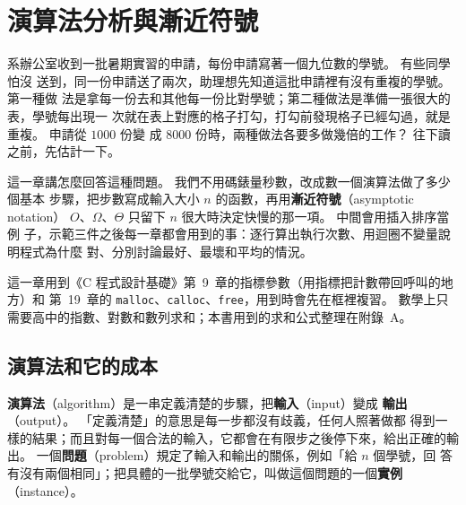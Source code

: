 \chapter{演算法分析與漸近符號}
\label{ch:analysis}

\newcommand{\insrow}[5]{%
    \node[anchor=east, font=\small] at (0.3, #1) {#2};
    \foreach \v [count=\k] in {#3} {
        \ifnum\k=#5\relax
            \node[hlcell] at (\k*0.9, #1) {\v};
        \else\ifnum\k>#4\relax
            \node[cell] at (\k*0.9, #1) {\v};
        \else
            \node[sortedcell] at (\k*0.9, #1) {\v};
        \fi\fi
    }
}

系辦公室收到一批暑期實習的申請，每份申請寫著一個九位數的學號。 有些同學怕沒
送到，同一份申請送了兩次，助理想先知道這批申請裡有沒有重複的學號。 第一種做
法是拿每一份去和其他每一份比對學號；第二種做法是準備一張很大的表，學號每出現一
次就在表上對應的格子打勾，打勾前發現格子已經勾過，就是重複。 申請從 $1000$ 份變
成 $8000$ 份時，兩種做法各要多做幾倍的工作？ 往下讀之前，先估計一下。

這一章講怎麼回答這種問題。 我們不用碼錶量秒數，改成數一個演算法做了多少個基本
步驟，把步數寫成輸入大小 $n$ 的函數，再用\textbf{漸近符號}（asymptotic notation）
$O$、$\Omega$、$\Theta$ 只留下 $n$ 很大時決定快慢的那一項。 中間會用插入排序當例
子，示範三件之後每一章都會用到的事：逐行算出執行次數、用迴圈不變量說明程式為什麼
對、分別討論最好、最壞和平均的情況。

這一章用到《C 程式設計基礎》第~9~章的指標參數（用指標把計數帶回呼叫的地方）和
第~19~章的 \texttt{malloc}、\texttt{calloc}、\texttt{free}，用到時會先在框裡複習。
數學上只需要高中的指數、對數和數列求和；本書用到的求和公式整理在附錄~A。

\section{演算法和它的成本}
\label{sec:ana-cost}

\textbf{演算法}（algorithm）是一串定義清楚的步驟，把\textbf{輸入}（input）變成
\textbf{輸出}（output）。 「定義清楚」的意思是每一步都沒有歧義，任何人照著做都
得到一樣的結果；而且對每一個合法的輸入，它都會在有限步之後停下來，給出正確的輸
出。 一個\textbf{問題}（problem）規定了輸入和輸出的關係，例如「給 $n$ 個學號，回
答有沒有兩個相同」；把具體的一批學號交給它，叫做這個問題的一個\textbf{實例}
（instance）。

